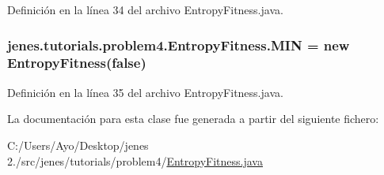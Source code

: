 Definición en la línea 34 del archivo Entropy\-Fitness.\-java.

\hypertarget{classjenes_1_1tutorials_1_1problem4_1_1_entropy_fitness_ab9c1db9f5da22216604985e98b6fc7e4}{
\subsubsection[{M\-I\-N}]{ jenes.\-tutorials.\-problem4.\-Entropy\-Fitness.\-M\-I\-N = new {\bf Entropy\-Fitness}(false)\hspace{0.3cm}{\ttfamily [static]}}}\label{classjenes_1_1tutorials_1_1problem4_1_1_entropy_fitness_ab9c1db9f5da22216604985e98b6fc7e4}


Definición en la línea 35 del archivo Entropy\-Fitness.\-java.



La documentación para esta clase fue generada a partir del siguiente fichero\-:\begin{DoxyCompactItemize}
\item 
C\-:/\-Users/\-Ayo/\-Desktop/jenes 2./src/jenes/tutorials/problem4/\hyperlink{_entropy_fitness_8java}{Entropy\-Fitness.\-java}\end{DoxyCompactItemize}

